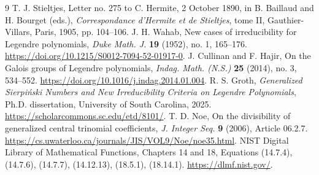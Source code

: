 \documentclass[11pt,a4paper]{article}
\numberwithin{equation}{section}
\theoremstyle{definition}
\begin{document}
\begin{thebibliography}{9}
 T. J. Stieltjes, Letter no. 275 to C. Hermite, 2 October 1890, in B. Baillaud and H. Bourget (eds.), \emph{Correspondance d'Hermite et de Stieltjes}, tome II, Gauthier-Villars, Paris, 1905, pp. 104--106.
 J. H. Wahab, New cases of irreducibility for Legendre polynomials, \emph{Duke Math. J.} \textbf{19} (1952), no. 1, 165--176. \url{https://doi.org/10.1215/S0012-7094-52-01917-0}.
 J. Cullinan and F. Hajir, On the Galois groups of Legendre polynomials, \emph{Indag. Math. (N.S.)} \textbf{25} (2014), no. 3, 534--552. \url{https://doi.org/10.1016/j.indag.2014.01.004}.
 R. S. Groth, \emph{Generalized Sierpi\'nski Numbers and New Irreducibility Criteria on Legendre Polynomials}, Ph.D. dissertation, University of South Carolina, 2025. \url{https://scholarcommons.sc.edu/etd/8101/}.
 T. D. Noe, On the divisibility of generalized central trinomial coefficients, \emph{J. Integer Seq.} \textbf{9} (2006), Article 06.2.7. \url{https://cs.uwaterloo.ca/journals/JIS/VOL9/Noe/noe35.html}.
 NIST Digital Library of Mathematical Functions, Chapters 14 and 18, Equations (14.7.4), (14.7.6), (14.7.7), (14.12.13), (18.5.1), (18.14.1). \url{https://dlmf.nist.gov/}.
\end{thebibliography}
\end{document}

